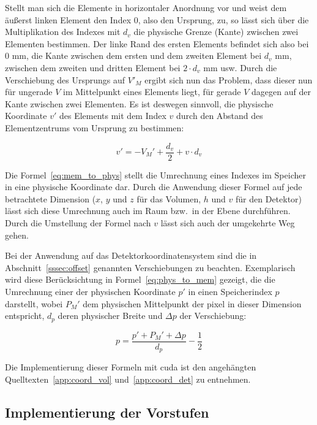 Stellt man sich die Elemente in horizontaler Anordnung vor und weist dem äußerst linken Element den Index $0$, also den
Ursprung, zu, so lässt sich über die Multiplikation des Indexes mit $d_v$ die physische Grenze (Kante) zwischen zwei
Elementen bestimmen. Der linke Rand des ersten Elements befindet sich also bei $0$ mm, die Kante zwischen dem ersten und
dem zweiten Element bei $d_v$ mm, zwischen dem zweiten und dritten Element bei $2 \cdot d_v$ mm usw. Durch die
Verschiebung des Ursprungs auf $V'_M$ ergibt sich nun das Problem, dass dieser nun für ungerade $V$ im Mittelpunkt eines
Elements liegt, für gerade $V$ dagegen auf der Kante zwischen zwei Elementen. Es ist deswegen sinnvoll, die physische
Koordinate $v'$ des Elements mit dem Index $v$ durch den Abstand des Elementzentrums vom Ursprung zu bestimmen:

\begin{equation}\label{eq:mem_to_phys}
    v' = -V_M' + \frac{d_v}{2} + v \cdot d_v
\end{equation}

Die Formel~\ref{eq:mem_to_phys} stellt die Umrechnung eines Indexes im Speicher in eine physische Koordinate dar. Durch
die Anwendung dieser Formel auf jede betrachtete Dimension ($x$, $y$ und $z$ für das Volumen, $h$ und $v$ für den
Detektor) lässt sich diese Umrechnung auch im Raum bzw.\ in der Ebene durchführen. Durch die Umstellung der Formel nach
$v$ lässt sich auch der umgekehrte Weg gehen.

Bei der Anwendung auf das Detektorkoordinatensystem sind die in Abschnitt~\ref{sssec:offset} genannten Verschiebungen zu
beachten. Exemplarisch wird diese Berücksichtung in Formel~\ref{eq:phys_to_mem} gezeigt, die die Umrechnung einer
der physischen Koordinate $p'$ in einen Speicherindex $p$ darstellt, wobei $P_M'$ dem physischen Mittelpunkt der
\gls{pixel} in dieser Dimension entspricht, $d_p$ deren physischer Breite und $\Delta p$ der Verschiebung:

\begin{equation}\label{eq:phys_to_mem}
    p = \frac{p' + P_M' + \Delta p}{d_p} - \frac{1}{2}
\end{equation}

Die Implementierung dieser Formeln mit \gls{cuda} ist den angehängten Quelltexten~\ref{app:coord_vol}
und~\ref{app:coord_det} zu entnehmen.

\subsection{Implementierung der Vorstufen}

